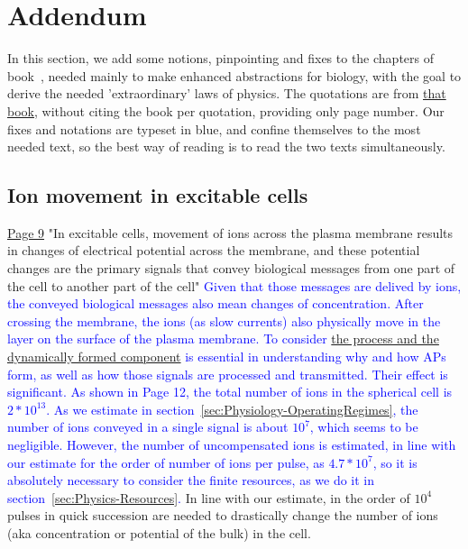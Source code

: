 
\section{Addendum\label{sec:Physology-Addendum}}


In this section, we add some notions, pinpointing and fixes to the chapters of book~\cite{JohnstonWuNeurophysiology:1995}, needed mainly to make 
enhanced abstractions for biology, with the goal to derive the needed 'extraordinary' laws of physics.
The quotations are from
\href{https://rcweb.dartmouth.edu/~mvdm/wiki/lib/exe/fetch.php?media=analysis:johnstonwu.pdf}{that book},
without citing the book per quotation, providing only page number. Our fixes and notations are
typeset in blue, and confine themselves to the most needed text,
so the best way of reading is to read the two texts simultaneously.

\subsection{Ion movement in excitable cells\label{sec:Physics-IonMovement}}
\href{https://rcweb.dartmouth.edu/~mvdm/wiki/lib/exe/fetch.php?media=analysis:johnstonwu.pdf}{Page 9} "In excitable cells, movement of
ions across the plasma membrane results in changes of electrical potential
across the membrane, and these potential changes are the primary signals
that convey biological messages from one part of the cell to another part
of the cell" \textcolor{blue}{Given that those messages are delived by ions, the conveyed biological messages also mean changes of concentration. After crossing the membrane,
the ions (as slow currents) also physically move in the layer on the surface of 
the plasma membrane. To consider \hyperlink{atomic_layer}{the process and the dynamically formed component} is essential in understanding why and how
APs form, as well as how those signals are processed and transmitted. Their effect is significant. As shown in Page 12, the total number of ions in the spherical cell is $2*10^{13}$. As we estimate in section~\ref{sec:Physiology-OperatingRegimes}, the number of ions conveyed in a single signal is about $10^{7}$, which seems to be negligible.  However, the 
number of uncompensated ions is estimated, in line with our estimate for the order of number of ions per pulse,  as $4.7*10^7$, so it is absolutely necessary to consider
the finite resources, as we do it in section~\ref{sec:Physics-Resources}.}
In line with our estimate, in the order of $10^4$ pulses in quick succession are needed to drastically change the number of ions (aka concentration or potential of the bulk) in the cell.

